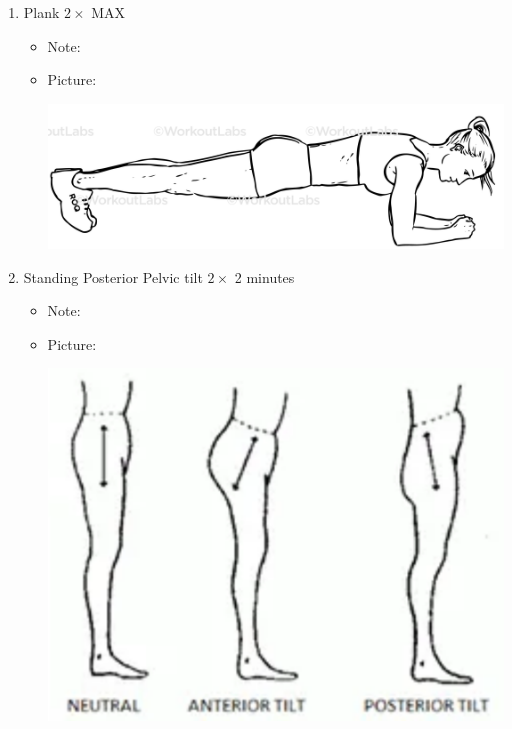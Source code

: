 \documentclass{article}
\begin{document}
\begin{enumerate}
\item Plank $2 \times$ MAX

    \begin{itemize}

        \item Note: 

        \item Picture:

        \includegraphics[width=.50\textwidth]{plank.png}

    \end{itemize}

\item Standing Posterior Pelvic tilt $2 \times$ 2 minutes

    \begin{itemize}

        \item Note: 

        \item Picture:

        \includegraphics[width=.50\textwidth]{anterior_tilt.png}


    \end{itemize}

\end{enumerate}
\end{document}
